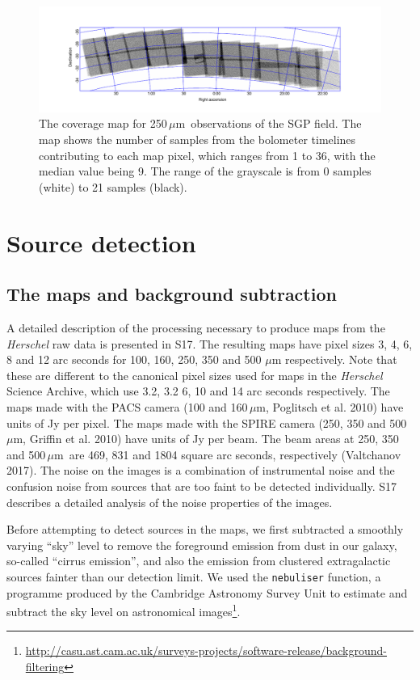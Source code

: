 \documentclass[a4paper,fleqn,usenatbib, twocolumn]{aastex61}
\def\mic{\,$\mu $m}
\begin{document}
\begin{figure} %
\includegraphics[scale=1., trim=0.0mm 5.0mm 0.0mm 5.0mm, clip=True]{sgpcoverage.pdf}
\caption{ \protect\label{skymaps} 
The coverage map for 250\mic\ observations
of the SGP field.
The map shows the number of samples from the bolometer timelines contributing
to each map pixel, which ranges from 1 to 36, with the median value being 9.
The range of the grayscale is from 0 samples (white) to 21 samples
(black).}
\end{figure}

\section{Source detection} 

\subsection{The maps and background subtraction} 

A detailed description of the processing necessary to produce maps
from the {\it Herschel} raw data is presented in S17. The resulting 
maps have pixel sizes 3, 4, 6, 8 and 12 arc seconds for 100, 160, 250,
350 and 500 $\mu$m respectively. Note that these are different to the
canonical pixel sizes used for maps in the {\it Herschel} Science Archive,
which use 3.2, 3.2 6, 10 and 14 arc seconds respectively.  The maps
made with the PACS camera (100 and 160\mic, Poglitsch et al. 2010)
have units of Jy per pixel. The maps made with the SPIRE camera (250,
350 and 500\mic, Griffin et al. 2010) have units of Jy per beam.  The
beam areas at 250, 350 and 500\mic\ are 469, 831 and 1804 square arc
seconds, respectively (Valtchanov 2017).  The noise on the images is a
combination of instrumental noise and the confusion noise from sources
that are too faint to be detected individually.  S17 describes a
detailed analysis of the noise properties of the images.

Before attempting to detect sources in the maps, we first subtracted a
smoothly varying ``sky'' level to remove the foreground emission from
dust in our galaxy, so-called ``cirrus emission'', and also the
emission from clustered extragalactic sources fainter than our
detection limit. We used the {\tt nebuliser} function, a programme
produced by the Cambridge Astronomy Survey Unit to estimate and
subtract the sky level on astronomical
images\footnote{\url{http://casu.ast.cam.ac.uk/surveys-projects/software-release/background-filtering}}.
\end{document}
